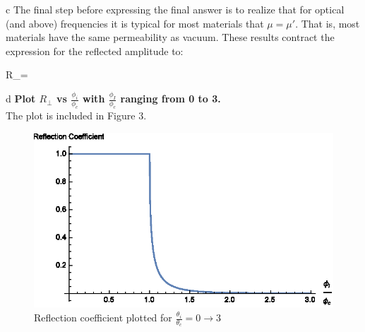 \begin{homeworkProblem}
\begin{homeworkSection}{c}
The final step before expressing the final answer is to realize that for optical (and above) frequencies it is typical for most materials that $\mu = \mu'$. That is, most materials have the same permeability as vacuum. These results contract the expression for the reflected amplitude to: 
\\

\begin{problemAnswer}
{
R_\bot = 
}
\end{problemAnswer}
\end{homeworkSection}
\begin{homeworkSection}{d}
\textbf{Plot $R_\bot$ vs $\frac{\phi_i}{\phi_c}$ with $\frac{\phi_I}{\phi_c}$ ranging from 0 to 3.}
\\

The plot is included in Figure 3.

\begin{figure}
\centering\includegraphics[width=.5\linewidth]{Images/RefCoefProb4.eps}
\caption{Reflection coefficient plotted for $\frac{\theta_i}{\theta_c} = 0 \rightarrow 3$}
\end{figure}
\end{homeworkSection}
\end{homeworkProblem}
